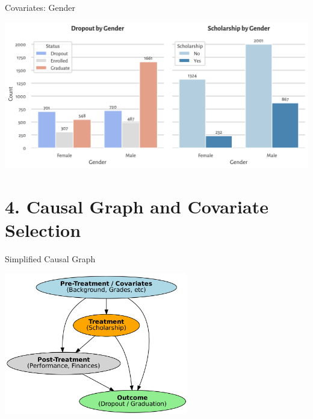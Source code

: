 \documentclass[aspectratio=169]{beamer}
\begin{document}
\begin{frame}{Covariates: Gender}
	\begin{center}
     \includegraphics[width=1\textwidth]{Tex_Pictures/Graph_gender.png}
     \end{center}
\end{frame}


\section{4. Causal Graph and Covariate Selection}

\begin{frame}{Simplified Causal Graph}
	\begin{center}
     \includegraphics[width=0.6\textwidth]{Tex_Pictures/DAG_simple.png}
     \end{center}
\end{frame}
\end{document}
